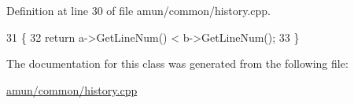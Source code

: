 Definition at line 30 of file amun/common/history.\+cpp.


\begin{DoxyCode}
31     \{
32       \textcolor{keywordflow}{return} a->GetLineNum() < b->GetLineNum();
33     \}
\end{DoxyCode}


The documentation for this class was generated from the following file\+:\begin{DoxyCompactItemize}
\item 
\hyperlink{amun_2common_2history_8cpp}{amun/common/history.\+cpp}\end{DoxyCompactItemize}
